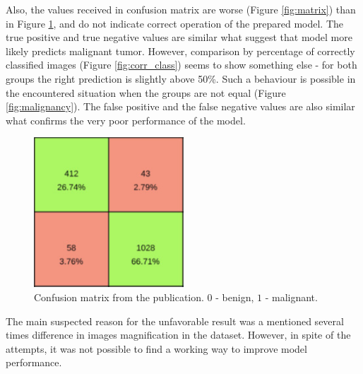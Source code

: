 \documentclass[12pt]{article}
\begin{document}
Also, the values received in confusion matrix are worse (Figure \ref{fig:matrix}) than in Figure \ref{fig:matrix_pub}, and do not indicate correct operation of the prepared model. The true positive and true negative values are similar what suggest that model more likely predicts malignant tumor. However, comparison by percentage of correctly classified images (Figure \ref{fig:corr_class}) seems to show something else - for both groups the right prediction is slightly above 50\%. Such a behaviour is possible in the encountered situation when the groups are not equal (Figure \ref{fig:malignancy}). The false positive and the false negative values are also similar what confirms the very poor performance of the model.
\clearpage

\begin{figure}[!ht]
\centering
\includegraphics[width=0.5\textwidth]{matrix_pub.png}
\caption{\label{fig:matrix_pub}Confusion matrix from the publication\cite{1}. $0$ - benign, $1$ - malignant.}
\end{figure}

The main suspected reason for the unfavorable result was a mentioned several times difference in images magnification in the dataset. However, in spite of the attempts, it was not possible to find a working way to improve model performance.





\end{document}
